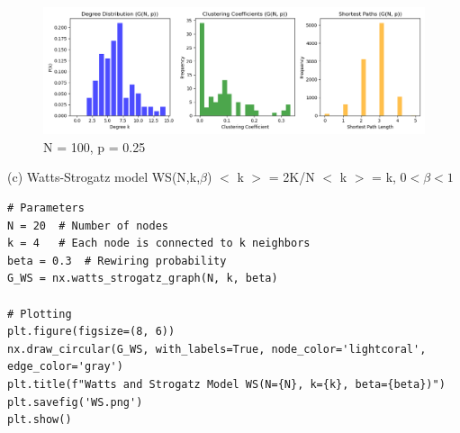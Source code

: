 \documentclass[10pt,letterpaper, onecolumn]{report}
\begin{document}
\begin{flushleft}
    \begin{figure}[htbp!] %
        \centering
        \includegraphics[width=1\textwidth]{../G(N, p)_Graph with 100 nodes and 317 edges.png} %
        \caption{N = 100, p = 0.25} %
    \end{figure}
    

    \clearpage

    (c) Watts-Strogatz model WS(N,k,$\beta$) $<$ k $>$ = 2K/N $<$ k $>$ = k, $ 0 < \beta < 1$

    \begin{lstlisting}[style=myPythonStyle, caption={Erdos-Renyi model}]
# Parameters
N = 20  # Number of nodes
k = 4   # Each node is connected to k neighbors
beta = 0.3  # Rewiring probability
G_WS = nx.watts_strogatz_graph(N, k, beta)

# Plotting
plt.figure(figsize=(8, 6))
nx.draw_circular(G_WS, with_labels=True, node_color='lightcoral', edge_color='gray')
plt.title(f"Watts and Strogatz Model WS(N={N}, k={k}, beta={beta})")
plt.savefig('WS.png')
plt.show()

    \end{lstlisting}


\end{flushleft}
\end{document}
